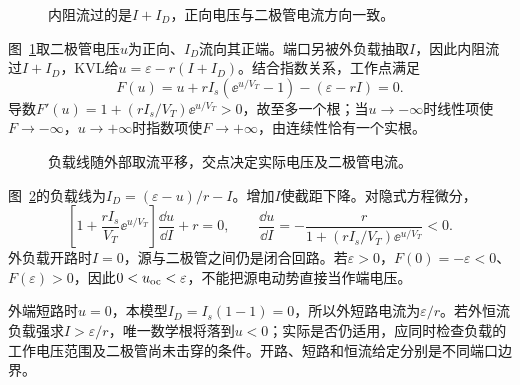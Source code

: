\begin{figure}[H]\centering
{}
\caption{内阻流过的是$I+I_D$，正向电压与二极管电流方向一致。}\label{fig:c4-diode-q}
\end{figure}
\begin{solution}
图~\ref{fig:c4-diode-q}取二极管电压$u$为正向、$I_D$流向其正端。端口另被外负载抽取$I$，因此内阻流过$I+I_D$，KVL给$u=\varepsilon-r(I+I_D)$。结合指数关系，工作点满足
\[
 \boxed{F(u)=u+rI_s(\ee^{u/V_T}-1)-(\varepsilon-rI)=0}.
\]
导数$F'(u)=1+(rI_s/V_T)\ee^{u/V_T}>0$，故至多一个根；当$u\to-\infty$时线性项使$F\to-\infty$，$u\to+\infty$时指数项使$F\to+\infty$，由连续性恰有一个实根。
\begin{figure}[H]\centering
{}
\caption{负载线随外部取流平移，交点决定实际电压及二极管电流。}\label{fig:c4-diode-s}
\end{figure}
图~\ref{fig:c4-diode-s}的负载线为$I_D=(\varepsilon-u)/r-I$。增加$I$使截距下降。对隐式方程微分，
\[
 \left[1+\frac{rI_s}{V_T}\ee^{u/V_T}\right]\frac{\dd u}{\dd I}+r=0,
 \qquad\boxed{\frac{\dd u}{\dd I}=-\frac r{1+(rI_s/V_T)\ee^{u/V_T}}<0}.
\]
外负载开路时$I=0$，源与二极管之间仍是闭合回路。若$\varepsilon>0$，$F(0)=-\varepsilon<0$、$F(\varepsilon)>0$，因此$0<u_{\rm oc}<\varepsilon$，不能把源电动势直接当作端电压。

外端短路时$u=0$，本模型$I_D=I_s(1-1)=0$，所以外短路电流为$\varepsilon/r$。若外恒流负载强求$I>\varepsilon/r$，唯一数学根将落到$u<0$；实际是否仍适用，应同时检查负载的工作电压范围及二极管尚未击穿的条件。开路、短路和恒流给定分别是不同端口边界。
\end{solution}

